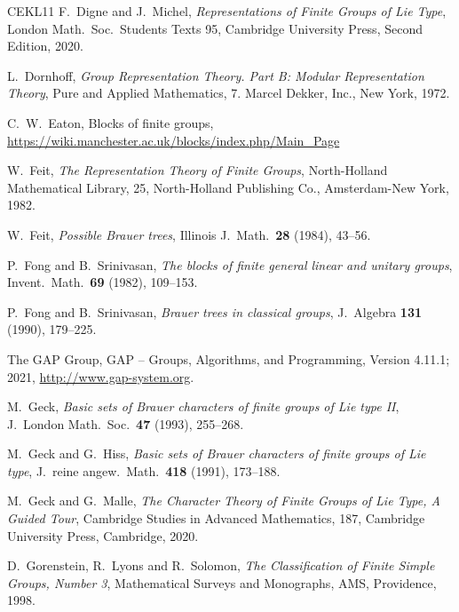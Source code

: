 \documentclass[12pt]{amsart}
\theoremstyle{theorem}
\theoremstyle{definition}
\theoremstyle{remark}
\begin{document}
\begin{thebibliography}{CEKL11}
 F.~Digne and J.~Michel, \emph{Representations of 
         Finite Groups of Lie Type}, London Math.\ Soc.\ Students Texts 95, 
         Cambridge University Press, Second Edition, 2020.

  {L.~Dornhoff}, \emph{Group Representation Theory. 
         Part B: Modular Representation Theory},
         Pure and Applied Mathematics, 7. Marcel Dekker, Inc., New York, 1972.

 C.~W.~Eaton, Blocks of finite groups,
        \url{https://wiki.manchester.ac.uk/blocks/index.php/Main_Page}

 W.~Feit, \emph{The Representation Theory of Finite 
        Groups}, North-Holland Mathematical Library, 25, North-Holland 
        Publishing Co., Amsterdam-New York, 1982.

 W.~Feit, \emph{Possible {B}rauer trees}, Illinois 
	J.\ Math.\ \textbf{28} (1984), 43--56.

 P.~Fong and B.~Srinivasan, \emph{The blocks of finite 
        general linear and unitary groups}, Invent.\ Math.\ \textbf{69} 
        (1982), 109--153.

 P.~Fong and B.~Srinivasan, \emph{Brauer trees in 
        classical groups}, J.~Algebra \textbf{131} (1990), 179--225.

 The GAP Group, GAP -- Groups, Algorithms, and
        Programming, Version 4.11.1; 2021, \url{http://www.gap-system.org}.

 M.~Geck, \emph{Basic sets of Brauer characters of finite
        groups of Lie type II}, J.~London Math.\ Soc.\ {\bf 47} (1993), 
        255--268.

 M.~Geck and G.~Hiss, \emph{Basic sets of Brauer 
        characters of finite groups of Lie type}, J.~reine angew.\ Math.\ 
        \textbf{418} (1991), 173--188.

 M.~Geck and G.~Malle, \emph{The Character Theory of 
        Finite Groups of Lie Type, A Guided Tour}, Cambridge Studies in Advanced
        Mathematics, 187, Cambridge University Press, Cambridge, 2020.

 D.\ Gorenstein, R.\ Lyons and R.\ Solomon, \emph{The 
	Classification of Finite Simple Groups, Number 3}, Mathematical 
	Surveys and Monographs, AMS, Providence, 1998.


\end{thebibliography}
\end{document}
